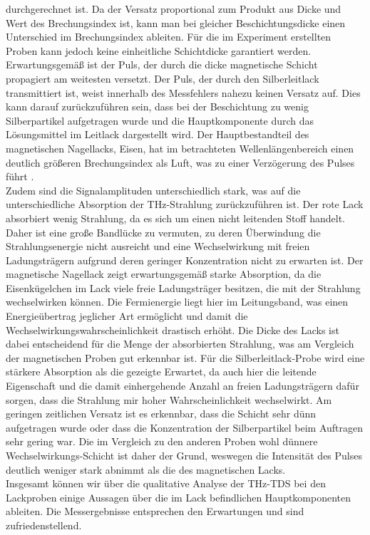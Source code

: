 durchgerechnet ist. Da der Versatz proportional zum 
Produkt aus Dicke und Wert des Brechungsindex ist, 
kann man bei gleicher Beschichtungsdicke einen 
Unterschied im Brechungsindex ableiten. 
Für die im Experiment erstellten Proben kann 
jedoch keine einheitliche Schichtdicke garantiert werden.
Erwartungsgemäß ist der Puls, der durch die dicke magnetische Schicht propagiert
am weitesten versetzt. Der Puls, der durch den Silberleitlack 
transmittiert ist, weist innerhalb des Messfehlers nahezu keinen 
Versatz auf. Dies kann darauf zurückzuführen sein, 
dass bei der Beschichtung zu wenig Silberpartikel aufgetragen 
wurde und die Hauptkomponente durch das Lösungsmittel 
im Leitlack dargestellt wird. 
Der Hauptbestandteil 
des magnetischen Nagellacks, Eisen, hat im betrachteten Wellenlängenbereich 
einen deutlich größeren Brechungsindex als Luft, was zu einer Verzögerung des 
Pulses führt \cite{Database}. \\
Zudem sind die Signalamplituden unterschiedlich stark, was 
auf die unterschiedliche Absorption der THz-Strahlung zurückzuführen 
ist. Der rote Lack absorbiert wenig Strahlung, da es sich 
um einen nicht leitenden Stoff handelt. Daher ist eine 
große Bandlücke zu vermuten, zu deren Überwindung die 
Strahlungsenergie nicht ausreicht und eine Wechselwirkung mit freien 
Ladungsträgern aufgrund deren geringer Konzentration nicht zu 
erwarten ist. Der magnetische Nagellack zeigt erwartungsgemäß 
starke Absorption, da die Eisenkügelchen im Lack viele 
freie Ladungsträger besitzen, die mit der Strahlung wechselwirken
können. Die Fermienergie liegt hier im Leitungsband, was 
einen Energieübertrag jeglicher Art ermöglicht und 
damit die Wechselwirkungswahrscheinlichkeit drastisch erhöht.
Die Dicke des Lacks ist dabei entscheidend für die Menge der absorbierten Strahlung, 
was am Vergleich der magnetischen Proben gut erkennbar ist. 
Für die Silberleitlack-Probe wird eine stärkere Absorption als die 
gezeigte Erwartet, da auch hier die leitende Eigenschaft und die 
damit einhergehende Anzahl an freien Ladungsträgern dafür sorgen, 
dass die Strahlung mir hoher Wahrscheinlichkeit wechselwirkt. 
Am geringen zeitlichen Versatz ist es erkennbar, dass die 
Schicht sehr dünn aufgetragen wurde oder dass die Konzentration der 
Silberpartikel beim Auftragen sehr gering war. Die im Vergleich zu den 
anderen Proben wohl dünnere Wechselwirkungs-Schicht ist daher der Grund, 
weswegen die Intensität des Pulses deutlich weniger stark abnimmt 
als die des magnetischen Lacks. \\
Insgesamt können wir über die qualitative Analyse der THz-TDS bei den 
Lackproben einige Aussagen über die im Lack befindlichen Hauptkomponenten 
ableiten. Die Messergebnisse entsprechen den Erwartungen und sind 
zufriedenstellend.